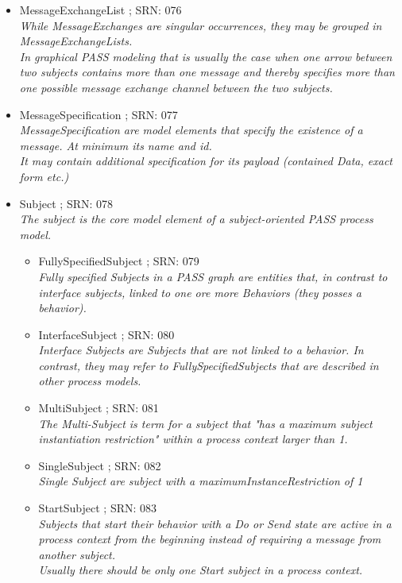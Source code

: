 \begin{itemize}
\begin{itemize}
\begin{itemize}
{		While message exchanges are singular occurrences, they may be grouped in MessageExchangeLists}
		\item MessageExchangeList ; SRN: 076 \\ \textit{While MessageExchanges are singular occurrences, they may be grouped in MessageExchangeLists.\\
		In graphical PASS modeling that is usually the case when one arrow between two subjects contains more than one message and thereby specifies more than one possible message exchange channel between the two subjects.}
		\item MessageSpecification ; SRN: 077 \\ \textit{MessageSpecification are model elements that specify the existence of a message. At minimum its name and id.\\It may contain additional specification for its payload (contained Data, exact form etc.)}
		\item Subject ; SRN: 078 \\ \textit{The subject is the core model element of a subject-oriented PASS process model.}
		\begin{itemize}
			\item FullySpecifiedSubject ; SRN: 079 \\ \textit{Fully specified Subjects in a PASS graph are entities that, in contrast to interface subjects, linked to one ore more Behaviors (they posses a behavior).}
			\item InterfaceSubject ; SRN: 080 \\ \textit{Interface Subjects are Subjects that are not linked to a behavior. In contrast, they may refer to FullySpecifiedSubjects that are described in other process models.}
			\item MultiSubject ; SRN: 081 \\ \textit{The Multi-Subject is term for a subject that "has a maximum subject instantiation restriction" within a process context larger than 1.}
			\item SingleSubject ; SRN: 082 \\ \textit{Single Subject are subject with a maximumInstanceRestriction of 1}
			\item StartSubject ; SRN: 083 \\ \textit{Subjects that start their behavior with a Do or Send state are active in a process context from the beginning instead of requiring a message from another subject.\\
			Usually there should be only one Start subject in a process context.}
		\end{itemize}
	\end{itemize}
				

\end{itemize}
\end{itemize}
